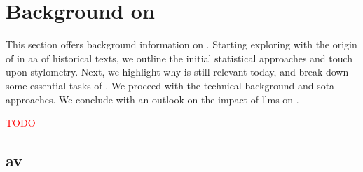 \chapter{Background on \ai{}}
\label{chap:authorship_identification}

This section offers background information on \ai{}.
Starting exploring with the origin of \ai{} in \ac{aa} of historical texts, we outline the initial statistical approaches and touch upon stylometry.
Next, we highlight why \ai{} is still relevant today, and break down some essential tasks of \ai{}.
We proceed with the technical background and \ac{sota} approaches.
We conclude with an outlook on the impact of \acp{llm} on \ai{}.

\textcolor{red}{TODO}
















\section{\acl{av}}





